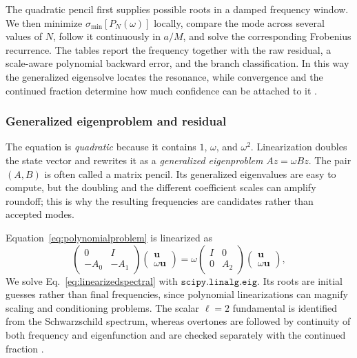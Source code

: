 \documentclass[12pt,a4paper]{article}
\begin{document}
\color{blue}
The quadratic pencil first supplies possible roots in a damped frequency
window. We then minimize \(\sigma_{\min}[P_N(\omega)]\) locally, compare the
mode across several values of \(N\), follow it continuously in \(a/M\), and
solve the corresponding Frobenius recurrence. The tables report the frequency
together with the raw residual, a scale-aware polynomial backward error, and
the branch classification. In this way the generalized eigensolve locates the
resonance, while convergence and the continued fraction determine how much
confidence can be attached to it \cite{Leaver1985,Jansen2017}.
\color{black}

\subsubsection{Generalized eigenproblem and residual}
\color{blue}

The equation is \emph{quadratic} because it contains \(1\), \(\omega\), and
\(\omega^2\).  Linearization doubles the state vector and rewrites it as a
\emph{generalized eigenproblem} \(Az=\omega Bz\).  The pair \((A,B)\) is often
called a matrix pencil.  Its generalized eigenvalues are easy to compute, but
the doubling and the different coefficient scales can amplify roundoff; this
is why the resulting frequencies are candidates rather than accepted modes.
\color{black}

Equation~\eqref{eq:polynomialproblem} is linearized as
\begin{equation}
\begin{pmatrix}
0&I\\
-A_0&-A_1
\end{pmatrix}
\begin{pmatrix}
\bm{u}\\
\omega\bm{u}
\end{pmatrix}
=
\omega
\begin{pmatrix}
I&0\\
0&A_2
\end{pmatrix}
\begin{pmatrix}
\bm{u}\\
\omega\bm{u}
\end{pmatrix},
\label{eq:linearizedspectral}
\end{equation}
\color{blue}
We solve Eq.~\eqref{eq:linearizedspectral} with
\(\texttt{scipy.linalg.eig}\). Its roots are initial guesses rather than final
frequencies, since polynomial linearizations can magnify scaling and
conditioning problems. The scalar \(\ell=2\) fundamental is identified from
the Schwarzschild spectrum, whereas overtones are followed by continuity of
both frequency and eigenfunction and are checked separately with the
continued fraction \cite{Leaver1985,Jansen2017}.
\color{black}
\end{document}
